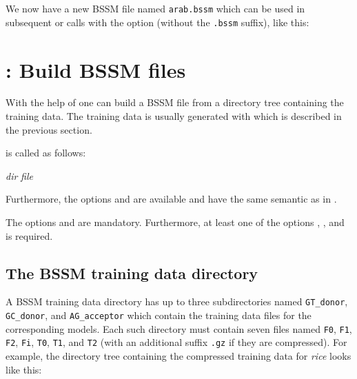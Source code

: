 \documentclass[11pt,a4paper,titlepage]{article}
\begin{document}

We now have a new BSSM file named \texttt{arab.bssm} which can be used in
subsequent \Callgth or \Callgthconsensus calls with the option 
(without the \texttt{.bssm} suffix), like this:



\section{\Callgthbssmbuild: Build BSSM files}
\label{gthbssmbuildsection}

With the help of \Callgthbssmbuild one can build a BSSM file from a directory
tree containing the training data. The training data is usually generated with
\Callgthbssmtrain which is described in the previous section.

\Callgthbssmbuild is called as follows:

\medskip
{}  \textit{dir}  \textit{file}
\medskip

\begin{Justshowoptions}
\end{Justshowoptions}

Furthermore, the options  and  are available 
and have the same semantic as in \Callgth.

The options  and  are mandatory.
Furthermore, at least one of the options , , and  is required.

\subsection{The BSSM training data directory}

A BSSM training data directory has up to three subdirectories named
\texttt{GT\_donor}, \texttt{GC\_donor}, and \texttt{AG\_acceptor} which contain
the training data files for the corresponding models. Each such directory must
contain seven files named \texttt{F0}, \texttt{F1}, \texttt{F2}, \texttt{Fi},
\texttt{T0}, \texttt{T1}, and \texttt{T2} (with an additional suffix \texttt{.gz} if they are compressed). For example, the directory tree containing the compressed training data for \emph{rice} looks like this:
\end{document}
